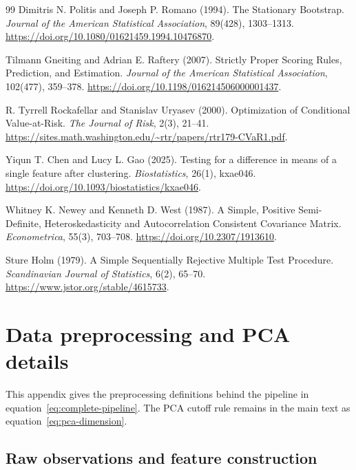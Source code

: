 \documentclass[11pt,a4paper]{article}
\begin{document}
\begin{thebibliography}{99}
Dimitris N. Politis and Joseph P. Romano (1994).
The Stationary Bootstrap.
\emph{Journal of the American Statistical Association}, 89(428), 1303--1313.
\url{https://doi.org/10.1080/01621459.1994.10476870}.

Tilmann Gneiting and Adrian E. Raftery (2007).
Strictly Proper Scoring Rules, Prediction, and Estimation.
\emph{Journal of the American Statistical Association}, 102(477), 359--378.
\url{https://doi.org/10.1198/016214506000001437}.

R. Tyrrell Rockafellar and Stanislav Uryasev (2000).
Optimization of Conditional Value-at-Risk.
\emph{The Journal of Risk}, 2(3), 21--41.
\url{https://sites.math.washington.edu/~rtr/papers/rtr179-CVaR1.pdf}.

Yiqun T. Chen and Lucy L. Gao (2025).
Testing for a difference in means of a single feature after clustering.
\emph{Biostatistics}, 26(1), kxae046.
\url{https://doi.org/10.1093/biostatistics/kxae046}.

Whitney K. Newey and Kenneth D. West (1987).
A Simple, Positive Semi-Definite, Heteroskedasticity and Autocorrelation Consistent Covariance Matrix.
\emph{Econometrica}, 55(3), 703--708.
\url{https://doi.org/10.2307/1913610}.

Sture Holm (1979).
A Simple Sequentially Rejective Multiple Test Procedure.
\emph{Scandinavian Journal of Statistics}, 6(2), 65--70.
\url{https://www.jstor.org/stable/4615733}.


\end{thebibliography}
\clearpage
\appendix
\section{Data preprocessing and PCA details}
\label{app:preprocessing}
\setcounter{equation}{0}
\renewcommand{\theequation}{\thesection.\arabic{equation}}

This appendix gives the preprocessing definitions behind the pipeline in equation~\eqref{eq:complete-pipeline}. The PCA cutoff rule remains in the main text as equation~\eqref{eq:pca-dimension}.

\subsection{Raw observations and feature construction}
\end{document}
